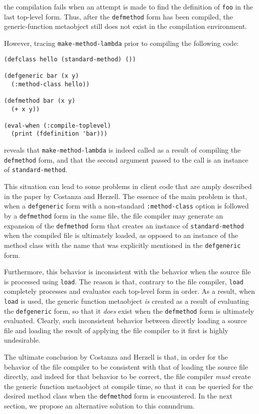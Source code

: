 \noindent
the compilation fails when an attempt is made to find the definition
of \texttt{foo} in the last top-level form.  Thus, after the
\texttt{defmethod} form has been compiled, the generic-function
metaobject still does not exist in the compilation environment.

However, tracing \texttt{make-method-lambda} prior to compiling the
following code:

\begin{verbatim}
(defclass hello (standard-method) ())

(defgeneric bar (x y)
  (:method-class hello))

(defmethod bar (x y)
  (+ x y))

(eval-when (:compile-toplevel)
  (print (fdefinition 'bar)))
\end{verbatim}

\noindent
reveals that \texttt{make-method-lambda} is indeed called as a result
of compiling the \texttt{defmethod} form, and that the second argument
passed to the call is an instance of \texttt{standard-method}.

This situation can lead to some problems in client code that are amply
described in the paper by Costanza and Herzell.  The essence of the
main problem is that, when a \texttt{defgeneric} form with a
non-standard \texttt{:method-class} option is followed by a
\texttt{defmethod} form in the same file, the file compiler may
generate an expansion of the \texttt{defmethod} form that creates an
instance of \texttt{standard-method} when the compiled file is
ultimately loaded, as opposed to an instance of the method class with
the name that was explicitly mentioned in the \texttt{defgeneric}
form.

Furthermore, this behavior is inconsistent with the behavior when the
source file is processed using \texttt{load}.  The reason is that,
contrary to the file compiler, \texttt{load} completely processes and
evaluates each top-level form in order.  As a result, when
\texttt{load} is used, the generic function metaobject \emph{is}
created as a result of evaluating the \texttt{defgeneric} form, so
that it \emph{does} exist when the \texttt{defmethod} form is
ultimately evaluated.  Clearly, such inconsistent behavior between
directly loading a source file and loading the result of applying the
file compiler to it first is highly undesirable.

The ultimate conclusion by Costanza and Herzell is that, in order for
the behavior of the file compiler to be consistent with that of
loading the source file directly, and indeed for that behavior to be
correct, the file compiler \emph{must} create the generic function
metaobject at compile time, so that it can be queried for the desired
method class when the \texttt{defmethod} form is encountered.  In the
next section, we propose an alternative solution to this conundrum.
